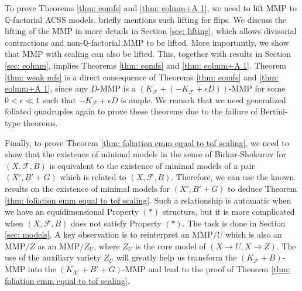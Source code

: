 \documentclass[11pt]{amsart}
\numberwithin{equation}{section}
\newcommand{\Qq}{\mathbb{Q}}
\newcommand{\Ff}{\mathcal{F}}
\theoremstyle{definition}
\theoremstyle{definition}
\theoremstyle{definition}
\begin{document}
To prove Theorems \ref{thm: eomfs} and \ref{thm: eolmm+A 1}, we need to lift MMP to $\Qq$-factorial ACSS models. \cite[Remark 3.3]{CS23a} briefly mentions such lifting for flips. We discuss the lifting of the MMP in more details in Section \ref{sec: lifting}, which allows divisorial contractions and non-$\Qq$-factorial MMP to be lifted. More importantly, we show that MMP with scaling can also be lifted. This, together with results in Section \ref{sec: eolmm}, implies Theorems \ref{thm: eomfs} and \ref{thm: eolmm+A 1}. Theorem \ref{thm: weak mfs} is a direct consequence of Theorems \ref{thm: eomfs} and \ref{thm: eolmm+A 1}, since any $D$-MMP is a $(K_{\Ff}+(-K_{\Ff}+\epsilon D))$-MMP for some $0<\epsilon\ll 1$ such that $-K_{\Ff}+\epsilon D$ is ample. We remark that we need generalized foliated quadruples again to prove these theorems due to the failure of Bertini-type theorems. 

Finally, to prove Theorem \ref{thm: foliation emm equal to tof scaling}, we need to show that the existence of minimal models in the sense of Birkar-Shokurov for $(X,\Ff,B)$ is equivalent to the existence of minimal models of a pair $(X',B'+G)$ which is related to $(X,\Ff,B)$. Therefore, we can use the known results on the existence of minimal models for $(X',B'+G)$ to deduce Theorem \ref{thm: foliation emm equal to tof scaling}. Such a relationship is automatic when we have an equidimensional Property $(*)$ structure, but it is more complicated when $(X,\Ff,B)$ does not satisfy Property $(*)$. The task is done in Section \ref{sec: models}. A key observation is to reinterpret an MMP$/U$ which is also an MMP$/Z$ as an MMP$/Z_U$, where $Z_U$ is the core model of $(X\rightarrow U, X\rightarrow Z)$. The use of the auxiliary variety $Z_U$ will greatly help us transform the $(K_{\Ff}+B)$-MMP into the $(K_{X'}+B'+G)$-MMP and lead to the proof of Theorem \ref{thm: foliation emm equal to tof scaling}.

\medskip
\end{document}
